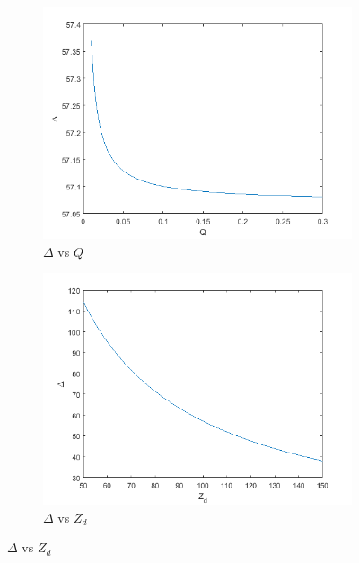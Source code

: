\documentclass[journal]{IEEEtran}
\begin{document}
	\begin{figure}
		\centering
		\begin{subfigure}[b]{1\linewidth}
			\includegraphics[width=\linewidth]{"delta vs q"}
				\caption{$\Delta$ vs $Q$}
		\end{subfigure}

		\begin{subfigure}[b]{1\linewidth}
			\includegraphics[width=\linewidth]{"delta vs dust charge"}
			\caption{$\Delta$ vs $Z_d$}
		\end{subfigure}


\end{figure}
\end{document}
